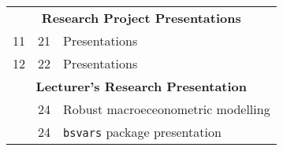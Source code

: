 \documentclass[10pt]{article}
\begin{document}
\begin{multicols}{2}
\begin{center}
\begin{tabular}{c c l}
\multicolumn{3}{c}{\textbf{Research Project Presentations}}\\
11   & 21 & Presentations \\
 12  & 22 & Presentations \\ [1ex]
\multicolumn{3}{c}{\textbf{Lecturer's Research Presentation}}\\
  & 24  & Robust macroeceonometric modelling\\
  & 24  & \texttt{bsvars} package presentation\\[1ex]
\bottomrule
\end{tabular}
\end{center}

\end{multicols}











\newpage
\end{document}
